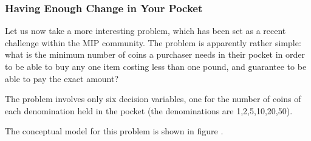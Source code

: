 \documentclass[a4wide]{article}
\begin{document}
\subsubsection{Having Enough Change in Your Pocket}
Let us now take a more interesting problem, which has been set as a
recent challenge within the MIP community.
The problem is apparently rather simple: what is the minimum number of
coins a purchaser needs in their pocket in order to be able to buy any one item
costing less than one pound, and guarantee to be able to pay the exact
amount?

The problem involves only six decision variables, one for the number of
coins of each denomination held in the pocket (the denominations are
1,2,5,10,20,50).

The conceptual model for this problem is shown in figure
\pageref{coinsconceptual}.
\end{document}

